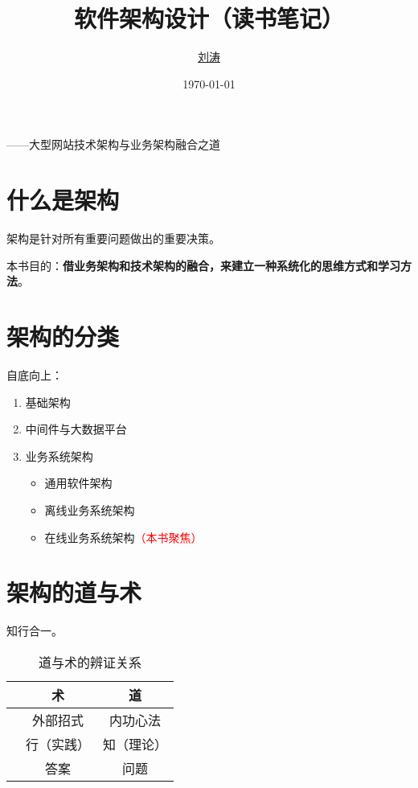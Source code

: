 \documentclass[cn,normal,12pt]{../elegantnote}
\title{软件架构设计（读书笔记）}
\author{\href{https://github.com/lightjameslyy/}{刘涛}}
\institute{中科院计算所}
\date{\today}
\begin{document}
\maketitle


——大型网站技术架构与业务架构融合之道

\section*{什么是架构}
\begin{definition}[架构]
   架构是针对所有重要问题做出的重要决策。
\end{definition}

本书目的：\textbf{借业务架构和技术架构的融合，来建立一种系统化的思维方式和学习方法}。

\section{架构的分类}
自底向上：
\begin{enumerate}
   \item 基础架构
   \item 中间件与大数据平台
   \item 业务系统架构
      \begin{itemize}
         \item 通用软件架构
         \item 离线业务系统架构
         \item 在线业务系统架构\textcolor{red}{（本书聚焦）}
      \end{itemize}
\end{enumerate}

\section{架构的道与术}
知行合一。

\begin{table}[htbp]
  \small
  \centering
  \caption{道与术的辨证关系}
    \begin{tabular}{lc|c}
    \toprule
                    &       术            &          道        \\
    \midrule
                    &     外部招式        &      内功心法      \\
                    &     行（实践）      &      知（理论）    \\
                    &       答案          &        问题        \\
    \bottomrule
    \end{tabular}%
  \label{tab:reg}%
\end{table}%
\end{document}
